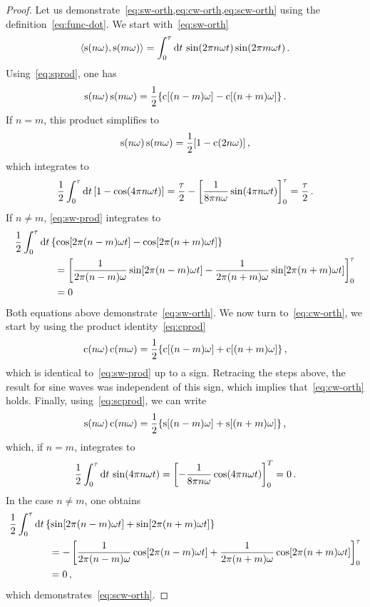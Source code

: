 \begin{proof}
  Let us demonstrate~\cref{eq:sw-orth,eq:cw-orth,eq:scw-orth} using the
  definition~\cref{eq:func-dot}. We start with~\cref{eq:sw-orth}
  \begin{equation}
    \braket{\operatorname{s}(n\omega),\operatorname{s}(m\omega)}=\int_{0}^{\tau}\mathrm{d} t\,
    \sin(2\pi n\omega t)\sin(2\pi m\omega t)\,.
  \end{equation}
  Using~\cref{eq:sprod}, one has
  \begin{equation}
    \operatorname{s}(n\omega)\operatorname{s}(m\omega)=\frac{1}{2}\{\operatorname{c}[(n-m)\omega]-\operatorname{c}[(n+m)\omega]\}\,.
    \label{eq:sw-prod}
  \end{equation}
  If $n=m$, this product simplifies to
  \begin{equation}
    \operatorname{s}(n\omega)\operatorname{s}(m\omega)=\frac{1}{2}[1-\operatorname{c}(2n\omega)]\,,
  \end{equation}
  which integrates to
  \begin{equation}
    \frac{1}{2}\int_{0}^{\tau}\mathrm{d} t\,[1-\cos(4\pi n\omega t)]=\frac{\tau}{2}-
    \left[\frac{1}{8\pi n\omega}\sin(4\pi n\omega t)\right]_0^\tau
    =\frac{\tau}{2}\,.
  \end{equation}
  If $n\neq m$, \cref{eq:sw-prod} integrates to
  \begin{align}
    &\frac{1}{2}\int_{0}^{\tau}\mathrm{d} t\,\{\cos[2\pi(n-m)\omega t]-\cos[2\pi(n+m)\omega t]\}\notag\\
    &\qquad\qquad=\left[\frac{1}{2\pi(n-m)\omega}\sin[2\pi(n-m)\omega t]
    -\frac{1}{2\pi(n+m)\omega}\sin[2\pi(n+m)\omega t]\right]_0^\tau\notag\\
    &\qquad\qquad=0
  \end{align}
  Both equations above demonstrate~\cref{eq:sw-orth}. We now turn to~\cref{eq:cw-orth}, we
  start by using the product identity~\cref{eq:cprod}
  \begin{equation}
    \operatorname{c}(n\omega)\operatorname{c}(m\omega)=\frac{1}{2}\{\operatorname{c}[(n-m)\omega]+\operatorname{c}[(n+m)\omega]\}\,,
  \end{equation}
  which is identical to~\cref{eq:sw-prod} up to a sign. Retracing the steps above, the
  result for sine waves was independent of this sign, which implies that~\cref{eq:cw-orth}
  holds. Finally, using~\cref{eq:scprod}, we can write
  \begin{equation}
    \operatorname{s}(n\omega)\operatorname{c}(m\omega)=\frac{1}{2}\{\operatorname{s}[(n-m)\omega]+\operatorname{s}[(n+m)\omega]\}\,,
  \end{equation}
  which, if $n=m$, integrates to
  \begin{equation}
    \frac{1}{2}\int_{0}^{\tau}\mathrm{d} t\,\sin(4\pi n\omega t)=
    \left[-\frac{1}{8\pi n\omega}\cos(4\pi n\omega t)\right]_0^T=0\,.
  \end{equation}
  In the case $n\neq m$, one obtains
  \begin{align}
    &\frac{1}{2}\int_{0}^{\tau}\mathrm{d} t\,\{\sin[2\pi(n-m)\omega t]+\sin[2\pi(n+m)\omega t]\}\notag\\
    &\qquad\qquad=-\left[\frac{1}{2\pi(n-m)\omega}\cos[2\pi(n-m)\omega t]
    +\frac{1}{2\pi(n+m)\omega}\cos[2\pi(n+m)\omega t]\right]_0^\tau\notag\\
    &\qquad\qquad=0\,,
  \end{align}
  which demonstrates~\cref{eq:scw-orth}.
\end{proof}
